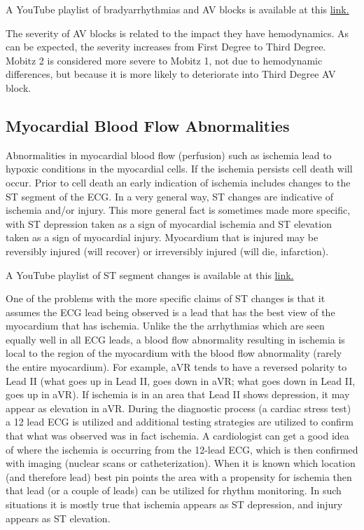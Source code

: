 A YouTube playlist of bradyarrhythmias and AV blocks is available at this \href{https://www.youtube.com/playlist?list=PLNN6HI4OXQmyt5Ql2um3MthEtLkdJnywd}{link.}

The severity of AV blocks is related to the impact they have hemodynamics. As can be expected, the severity increases from First Degree to Third Degree. Mobitz 2 is considered more severe to Mobitz 1, not due to hemodynamic differences, but because it is more likely to deteriorate into Third Degree AV block.

\subsection{Myocardial Blood Flow Abnormalities}

Abnormalities in myocardial blood flow (perfusion) such as ischemia lead to hypoxic conditions in the myocardial cells. If the ischemia persists cell death will occur. Prior to cell death an early indication of ischemia includes changes to the ST segment of the ECG. In a very general way, ST changes are indicative of ischemia and/or injury. This more general fact is sometimes made more specific, with ST depression taken as a sign of myocardial ischemia and ST elevation taken as a sign of myocardial injury. Myocardium that is injured may be reversibly injured (will recover) or irreversibly injured (will die, infarction). 

A YouTube playlist of ST segment changes is available at this \href{https://www.youtube.com/playlist?list=PLNN6HI4OXQmyHL-CDiLqrBSkv6E1Vk0cS}{link.}

One of the problems with the more specific claims of ST changes is that it assumes the ECG lead being observed is a lead that has the best view of the myocardium that has ischemia. Unlike the the arrhythmias which are seen equally well in all ECG leads, a blood flow abnormality resulting in ischemia is local to the region of the myocardium with the blood flow abnormality (rarely the entire myocardium). For example, aVR tends to have a reversed polarity to Lead II (what goes up in Lead II, goes down in aVR; what goes down in Lead II, goes up in aVR). If ischemia is in an area that Lead II shows depression, it may appear as elevation in aVR. During the diagnostic process (a cardiac stress test) a 12 lead ECG is utilized and additional testing strategies are utilized to confirm that what was observed was in fact ischemia. A cardiologist can get a good idea of where the ischemia is occurring from the 12-lead ECG, which is then confirmed with imaging (nuclear scans or catheterization). When it is known which location (and therefore lead) best pin points the area with a propensity for ischemia then that lead (or a couple of leads) can be utilized for rhythm monitoring. In such situations it is mostly true that ischemia appears as ST depression, and injury appears as ST elevation.

